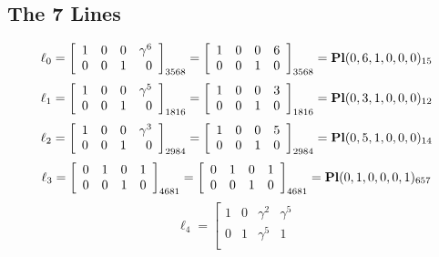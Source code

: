 \documentclass{article}
\begin{document}
{\subsection*{The 7 Lines}
$$
\ell_{0} = 
\left[
\begin{array}{*{4}{r}}
1 & 0 & 0 & \gamma^{6}\\
0 & 0 & 1 & 0\\
\end{array}
\right]
_{3568}
=
\left[
\begin{array}{*{4}c}
1  & 0  & 0  & 6\\
0  & 0  & 1  & 0\\
\end{array}
\right]_{3568}
={\rm\bf Pl}(0,6,1,0,0,0 )_{15}$$
$$
\ell_{1} = 
\left[
\begin{array}{*{4}{r}}
1 & 0 & 0 & \gamma^{5}\\
0 & 0 & 1 & 0\\
\end{array}
\right]
_{1816}
=
\left[
\begin{array}{*{4}c}
1  & 0  & 0  & 3\\
0  & 0  & 1  & 0\\
\end{array}
\right]_{1816}
={\rm\bf Pl}(0,3,1,0,0,0 )_{12}$$
$$
\ell_{2} = 
\left[
\begin{array}{*{4}{r}}
1 & 0 & 0 & \gamma^{3}\\
0 & 0 & 1 & 0\\
\end{array}
\right]
_{2984}
=
\left[
\begin{array}{*{4}c}
1  & 0  & 0  & 5\\
0  & 0  & 1  & 0\\
\end{array}
\right]_{2984}
={\rm\bf Pl}(0,5,1,0,0,0 )_{14}$$
$$
\ell_{3} = 
\left[
\begin{array}{*{4}{r}}
0 & 1 & 0 & 1\\
0 & 0 & 1 & 0\\
\end{array}
\right]
_{4681}
=
\left[
\begin{array}{*{4}c}
0  & 1  & 0  & 1\\
0  & 0  & 1  & 0\\
\end{array}
\right]_{4681}
={\rm\bf Pl}(0,1,0,0,0,1 )_{657}$$
$$
\ell_{4} = 
\left[
\begin{array}{*{4}{r}}
1 & 0 & \gamma^{2} & \gamma^{5}\\
0 & 1 & \gamma^{5} & 1\\

\end{array}$$}
\end{document}
